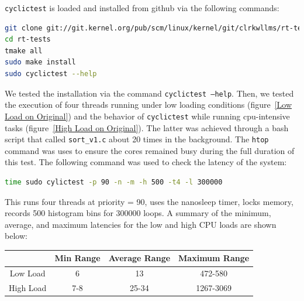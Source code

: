 \documentclass[a4paper,10pt]{article}
\newcommand{\code}[1]{\colorbox{light-gray}{\texttt{#1}}}
\begin{document}
\code{cyclictest} is loaded and installed from github via the following commands:
\begin{center}
\begin{lstlisting}[language=bash, label=code:code1] 
git clone git://git.kernel.org/pub/scm/linux/kernel/git/clrkwllms/rt-tests.git
cd rt-tests
tmake all
sudo make install
sudo cyclictest --help
\end{lstlisting}
\end{center}\vspace{-1em}





We tested the installation via the command \code{cyclictest --help}. Then, we tested the execution of four threads running under low loading conditions (figure~\ref{Low Load on Original}) and the behavior of \code{cyclictest} while running cpu-intensive tasks (figure~\ref{High Load on Original}). The latter was achieved through a bash script that called \code{sort\_v1.c} about 20 times in the background. The \code{htop} command was uses to ensure the cores remained busy during the full duration of this test. The following command was used to check the latency of the system:
\begin{center}
\begin{lstlisting}[language=bash, label=code:code2] 
time sudo cylictest -p 90 -n -m -h 500 -t4 -l 300000
\end{lstlisting}
\end{center}\vspace{-1em}


This runs four threads at priority = 90, uses the nanosleep timer, locks memory, records 500 histogram bins for 300000 loops. A summary of the minimum, average, and maximum latencies for the low and high CPU loads are shown below:

\begin{center}
\begin{tabular}{||c c c c||} 
 \hline
  & Min Range & Average Range & Maximum Range \\ [0.5ex] 
 \hline\hline
 Low Load & 6 & 13 & 472-580 \\ 
 \hline
 High Load & 7-8 & 25-34 & 1267-3069 \\ [1ex] 
 \hline
\end{tabular}
\end{center}
\end{document}
